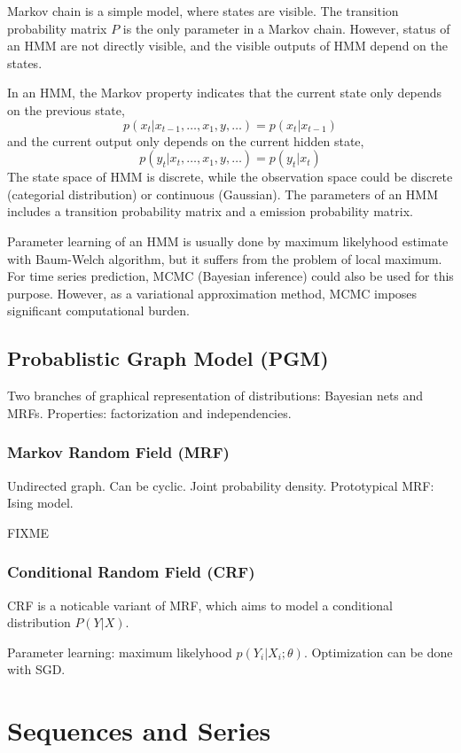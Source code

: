 Markov chain is a simple model, where states are visible. The transition
probability matrix $P$ is the only parameter in a Markov chain. However,
status of an HMM are not directly visible, and the visible outputs of HMM
depend on the states.

In an HMM, the Markov property indicates that the current state only depends
on the previous state,
$$ p(x_t|x_{t-1}, \ldots, x_1, y, \ldots) = p(x_t|x_{t-1})$$
and the current output only depends on the current hidden state,
$$ p(y_t|x_t, \ldots, x_1, y, \ldots) = p(y_t|x_t)$$
The state space of HMM is discrete, while the observation space could be
discrete (categorial distribution) or continuous (Gaussian). The parameters
of an HMM includes a transition probability matrix and a emission probability
matrix.

Parameter learning of an HMM is usually done by maximum likelyhood estimate
with Baum-Welch algorithm, but it suffers from the problem of local maximum.
For time series prediction, MCMC (Bayesian inference) could also be used for
this purpose. However, as a variational approximation method, MCMC imposes
significant computational burden.

\subsection{Probablistic Graph Model (PGM)}

Two branches of graphical representation of distributions: Bayesian nets and
MRFs. Properties: factorization and independencies.

\subsubsection{Markov Random Field (MRF)}

Undirected graph. Can be cyclic. Joint probability density.
Prototypical MRF: Ising model.

FIXME

\subsubsection{Conditional Random Field (CRF)}

CRF is a noticable variant of MRF, which aims to model a conditional
distribution $P(Y|X)$.

Parameter learning: maximum likelyhood $p(Y_i|X_i;\theta)$. Optimization
can be done with SGD.

\section{Sequences and Series}

